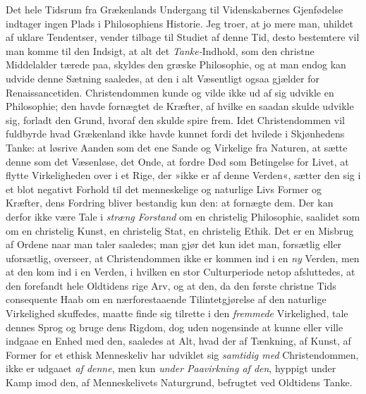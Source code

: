 \documentclass[12pt,a4paper]{book}
\newcommand{\opage}[1]{\marginnote{\footnotesize\textit{[#1]}}}
\begin{document}
Det hele Tidsrum fra Grækenlands Undergang til Videnskabernes
Gjenfødelse indtager ingen Plads i Philosophiens Historie. Jeg troer,
at jo mere man, uhildet af uklare Tendentser, vender tilbage til
Studiet af denne Tid, desto bestemtere vil man komme til den Indsigt,
at alt det \emph{Tanke-}Indhold, som den christne Middelalder tærede
paa, skyldes den græske Philosophie, og at man endog kan udvide denne
Sætning saaledes, at den i alt Væsentligt ogsaa gjælder for
Renaissancetiden. Christendommen kunde og vilde ikke ud af sig udvikle
en Philosophie; den havde fornægtet de Kræfter, af hvilke en saadan
skulde udvikle sig, forladt den Grund, hvoraf den skulde spire frem.
Idet Christendommen vil fuldbyrde hvad Grækenland ikke havde kunnet
fordi det hvilede i Skjønhedens Tanke: at løsrive Aanden som det ene
Sande og Virkelige fra Naturen, at sætte denne som det Væsenløse, det
Onde, at fordre Død som Betingelse for Livet, at flytte Virkeligheden
over i et Rige, der »ikke er af denne Verden«, sætter den sig i et
blot negativt Forhold
\opage{5} til det menneskelige og naturlige Livs Former og Kræfter, dens
Fordring bliver bestandig kun den: at fornægte dem. Der kan derfor
ikke være Tale i \emph{stræng Forstand} om en christelig Philosophie,
saalidet som om en christelig Kunst, en christelig Stat, en christelig
Ethik. Det er en Misbrug af Ordene naar man taler saaledes; man gjør
det kun idet man, forsætlig eller uforsætlig, overseer, at
Christendommen ikke er kommen ind i en \emph{ny} Verden, men at den
kom ind i en Verden, i hvilken en stor Culturperiode netop
afsluttedes, at den forefandt hele Oldtidens rige Arv, og at den, da
den første christne Tids consequente Haab om en nærforestaaende
Tilintetgjørelse af den naturlige Virkelighed skuffedes, maatte finde
sig tilrette i den \emph{fremmede} Virkelighed, tale dennes Sprog og
bruge dens Rigdom, dog uden nogensinde at kunne eller ville indgaae en
Enhed med den, saaledes at Alt, hvad der af Tænkning, af Kunst, af
Former for et ethisk Menneskeliv har udviklet sig \emph{samtidig med}
Christendommen, ikke er udgaaet \emph{af denne}, men kun
\emph{under Paavirkning af den}, hyppigt under Kamp imod den, af
Menneskelivets Naturgrund, befrugtet ved Oldtidens Tanke.
\end{document}
